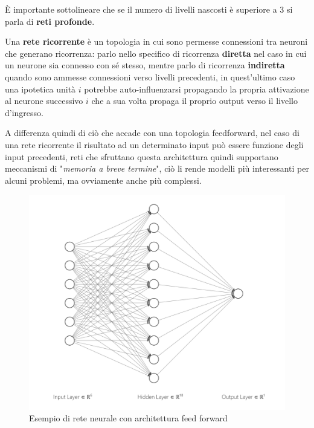 \documentclass[../../main.tex]{subfiles}
\begin{document}
È importante sottolineare che se il numero di livelli nascosti è superiore a 3 si parla di \textbf{reti profonde}.

\begin{dfn}
    Una \textbf{rete ricorrente} è un topologia in cui sono permesse connessioni tra neuroni che generano ricorrenza: parlo nello specifico di ricorrenza \textbf{diretta} nel caso in cui un neurone sia connesso con sé stesso, mentre parlo di ricorrenza \textbf{indiretta} quando sono ammesse connessioni verso livelli precedenti, in quest'ultimo caso una ipotetica unità $i$ potrebbe auto-influenzarsi propagando la propria attivazione al neurone successivo $i$ che a sua volta propaga il proprio output verso il livello d'ingresso.
\end{dfn}

A differenza quindi di ciò che accade con una topologia feedforward, nel caso di una rete ricorrente il risultato ad un determinato input può essere funzione degli input precedenti, reti che sfruttano questa architettura quindi supportano meccanismi di "\textit{memoria a breve termine}", ciò li rende modelli più interessanti per alcuni problemi, ma ovviamente anche più complessi.

\begin{figure}[H]
    \centering
    \includegraphics[width=\textwidth]{immagini/4_2/feed_forward.png}
    \caption{Esempio di rete neurale con architettura feed forward}
    \label{fig:feedforward}
\end{figure}
\end{document}
